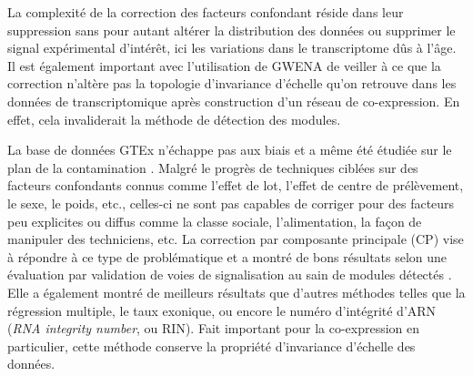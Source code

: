 La complexité de la correction des facteurs confondant réside dans leur suppression sans pour autant altérer la distribution des données ou supprimer le signal expérimental d'intérêt, ici les variations dans le transcriptome dûs à l'âge. Il est également important avec l'utilisation de GWENA de veiller à ce que la correction n'altère pas la topologie d'invariance d'échelle qu'on retrouve dans les données de transcriptomique après construction d'un réseau de co-expression. En effet, cela invaliderait la méthode de détection des modules.


La base de données GTEx n'échappe pas aux biais et a même été étudiée sur le plan de la contamination .
Malgré le progrès de techniques ciblées sur des facteurs confondants connus comme l'effet de lot, l'effet de centre de prélèvement, le sexe, le poids, etc., celles-ci ne sont pas capables de corriger pour des facteurs peu explicites ou diffus comme la classe sociale, l'alimentation, la façon de manipuler des techniciens, etc. La correction par composante principale (CP) vise à répondre à ce type de problématique et a montré de bons résultats selon une évaluation par validation de voies de signalisation au sain de modules détectés . Elle a également montré de meilleurs résultats que d'autres méthodes telles que la régression multiple, le taux exonique, ou encore le numéro d'intégrité d'ARN (\textit{RNA integrity number}, ou RIN). Fait important pour la co-expression en particulier, cette méthode conserve la propriété d'invariance d'échelle des données.

